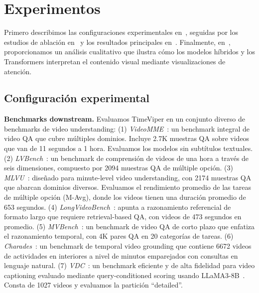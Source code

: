 \documentclass[10pt,twocolumn,letterpaper]{article}
\begin{document}


\section{Experimentos}
\label{sec:exp}
Primero describimos las configuraciones experimentales en~, seguidas por los estudios de ablación en~ y los resultados principales en~. 
Finalmente, en~, proporcionamos un análisis cualitativo que ilustra cómo los modelos híbridos y los Transformers interpretan el contenido visual mediante visualizaciones de atención.



\subsection{Configuración experimental}
\label{subsec: exp_setups}

\noindent\textbf{Benchmarks downstream.}
Evaluamos TimeViper en un conjunto diverso de benchmarks de video understanding:
(1) \textit{VideoMME}~\cite{fu2025videomme}: un benchmark integral de video QA que cubre múltiples dominios. Incluye 2.7K muestras QA sobre videos que van de 11 segundos a 1 hora. Evaluamos los modelos sin subtítulos textuales.
(2) \textit{LVBench}~\cite{wang2025lvbench}: un benchmark de comprensión de videos de una hora a través de seis dimensiones, compuesto por 2094 muestras QA de múltiple opción.
(3) \textit{MLVU}~\cite{zhou2025mlvu}: diseñado para minute-level video understanding, con 2174 muestras QA que abarcan dominios diversos.
Evaluamos el rendimiento promedio de las tareas de múltiple opción (M-Avg), donde los videos tienen una duración promedio de 653 segundos.
(4) \textit{LongVideoBench}~\cite{wu2024longvideobench}: apunta a razonamiento referencial de formato largo que requiere retrieval-based QA, con videos de 473 segundos en promedio.
(5) \textit{MVBench}~\cite{li2024mvbench}: un benchmark de video QA de corto plazo que enfatiza el razonamiento temporal, con 4K pares QA en 20 categorías de tareas. 
(6) \textit{Charades}~\cite{sigurdsson2018charades}: un benchmark de temporal video grounding que contiene 6672 videos de actividades en interiores a nivel de minutos emparejados con consultas en lenguaje natural.
(7) \textit{VDC}~\cite{chai2025auroracap}: un benchmark eficiente y de alta fidelidad para video captioning evaluado mediante query-conditioned scoring usando LLaMA3-8B~\cite{dubey2024llama3}. Consta de 1027 videos y evaluamos la partición ``detailed''.
\end{document}
